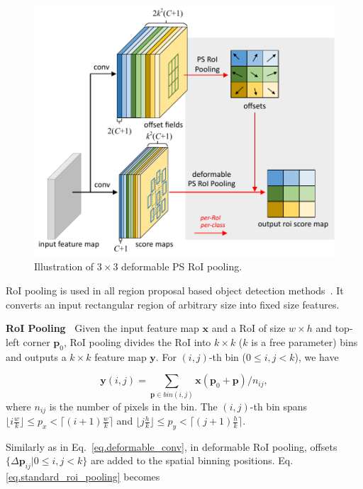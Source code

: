 \documentclass[10pt,twocolumn,letterpaper]{article}
\begin{document}
\begin{figure}
\centering
  \includegraphics[width=\linewidth]{deform_pspool_layer_v4.pdf}
  \caption{Illustration of $3\times 3$ deformable PS RoI pooling.}
\label{fig.deformable_psroi_pooling_structure}
\end{figure}

RoI pooling is used in all region proposal based object detection methods~\cite{girshick2014rich,girshick2015fast,ren2015faster,dai2016rfcn}. It
converts an input rectangular region of arbitrary size into fixed size features.

\textbf{RoI Pooling~\cite{girshick2015fast}} Given the input feature map $\mathbf{x}$ and a RoI of size $w\times h$ and top-left corner $\mathbf{p}_0$, RoI pooling divides the RoI into $k\times k$ ($k$ is a free parameter) bins and outputs a $k\times k$ feature map $\mathbf{y}$. For $(i,j)$-th bin ($0\le i,j < k$), we have

\begin{equation}
\mathbf{y}(i,j)=\sum_{\mathbf{p}\in bin(i,j)} \mathbf{x}(\mathbf{p}_0+\mathbf{p})/n_{ij},
\label{eq.standard_roi_pooling}
\end{equation}
where $n_{ij}$ is the number of pixels in the bin. The $(i,j)$-th bin spans $\lfloor i \frac{w}{k} \rfloor \le p_x < \lceil (i+1)\frac{w}{k}\rceil$ and $\lfloor j \frac{h}{k}\rfloor \le p_y < \lceil (j+1)\frac{h}{k} \rceil$.

Similarly as in Eq.~\eqref{eq.deformable_conv}, in deformable RoI pooling, offsets $\{\Delta \mathbf{p}_{ij}|0\le i,j < k\}$ are added to the spatial binning positions. Eq.\eqref{eq.standard_roi_pooling} becomes
\end{document}
